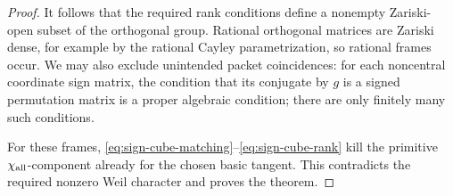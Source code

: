 \begin{proof}
It follows that the required rank conditions define a nonempty
Zariski-open subset of the orthogonal group.  Rational orthogonal
matrices are Zariski dense, for example by the rational Cayley
parametrization, so rational frames occur.  We may also exclude
unintended packet coincidences: for each noncentral coordinate
sign matrix, the condition that its conjugate by \(g\) is a signed
permutation matrix is a proper algebraic condition; there are
only finitely many such conditions.

For these frames, \eqref{eq:sign-cube-matching}--\eqref{eq:sign-cube-rank} kill the primitive
\(\chi_{\rm all}\)-component already for the chosen basic tangent.
This contradicts the required nonzero Weil character and proves
the theorem.
\end{proof}

